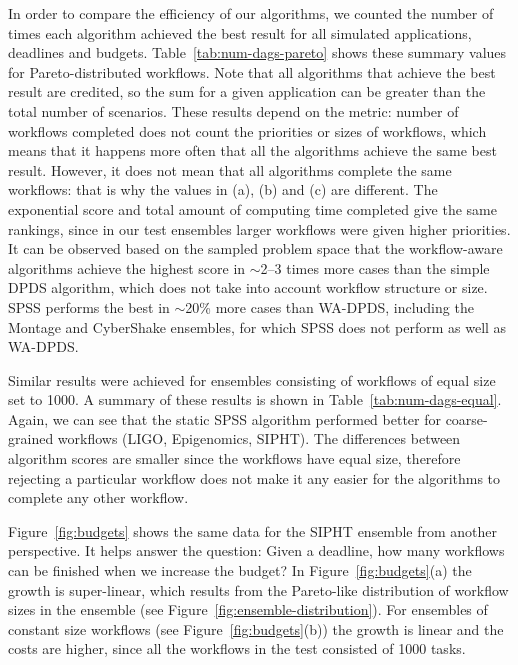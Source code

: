 \documentclass{sig-alternate}
\begin{document}
       
In order to compare the efficiency of our algorithms, we counted the number of times
each algorithm achieved the best result for all simulated applications, deadlines
and budgets. Table~\ref{tab:num-dags-pareto} shows these summary values for 
Pareto-distri\-buted workflows. Note that all algorithms that achieve the best 
result are credited, so the sum for a given application can be greater than the
total number of scenarios. These results depend on the metric: number of
workflows completed does not count the priorities or sizes of workflows, which
means that it happens more often that all the algorithms achieve the same best
result. However, it does not mean that all algorithms complete the same
workflows: that is why the values in (a), (b) and (c) are different. The 
exponential score and total amount of computing time completed give the same
rankings, since in our test ensembles larger workflows were given higher
priorities. It can be observed based on the sampled problem space that the
workflow-aware algorithms achieve the highest score in $\sim$2--3 times more 
cases than the simple DPDS algorithm, which does not take into account workflow 
structure or size. SPSS performs the best in $\sim$20\% more cases than WA-DPDS,
including the Montage and CyberShake ensembles, for which SPSS does not 
perform as well as WA-DPDS.

Similar results were achieved for ensembles consisting of workflows of equal
size set to 1000. A summary of these results is shown in
Table~\ref{tab:num-dags-equal}. Again, we can see that the static SPSS algorithm performed better for coarse-grained
workflows (LIGO, Epigenomics, SIPHT). The differences between algorithm scores
are smaller since the workflows have equal size, therefore rejecting a particular
workflow does not make it any easier for the algorithms to complete any other 
workflow.

Figure~\ref{fig:budgets} shows the same data for the SIPHT ensemble from another
perspective. It helps answer the question: Given a deadline, how many workflows
can be finished when we increase the budget? In Figure~\ref{fig:budgets}(a) the
growth is super-linear, which results from the Pareto-like distribution of 
workflow sizes in the ensemble (see Figure~\ref{fig:ensemble-distribution}). 
For ensembles of constant size workflows (see Figure~\ref{fig:budgets}(b)) 
the growth is linear and the costs are higher, since all the workflows in the
test consisted of 1000 tasks.
\end{document}

